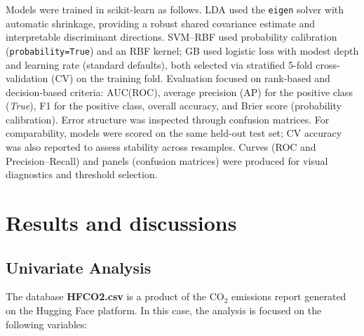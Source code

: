 \documentclass[journal]{IEEEtran}
\begin{document}
Models were trained in scikit-learn as follows.
LDA used the \texttt{eigen} solver with automatic shrinkage, providing a robust
shared covariance estimate and interpretable discriminant directions. SVM–RBF used
probability calibration (\texttt{probability=True}) and an RBF kernel; GB used
logistic loss with modest depth and learning rate (standard defaults), both selected
via stratified 5-fold cross-validation (CV) on the training fold. Evaluation focused
on rank-based and decision-based criteria: AUC(ROC), average precision (AP) for the
positive class (\emph{True}), F1 for the positive class, overall accuracy, and
Brier score (probability calibration). Error structure was inspected through
confusion matrices. For comparability, models were scored on the same held-out test
set; CV accuracy was also reported to assess stability across resamples. Curves
(ROC and Precision–Recall) and panels (confusion matrices) were produced for visual
diagnostics and threshold selection.
	\section{Results and discussions}

	\label{sec:results}

	 \subsection{Univariate Analysis}
	 \label{ssec:unianal}
	 The database \textbf{HFCO2.csv} is a product of the $\text{CO}_2$ emissions report generated on the Hugging Face platform. In this case, the analysis is focused on the following variables:
\end{document}
